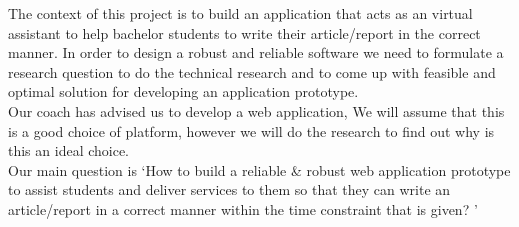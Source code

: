 The context of this project is to build an application that acts as an virtual assistant to help bachelor students to write their article/report in the correct manner. In order to design a robust and reliable software we need to formulate a research question to do the technical research and to come up with feasible and optimal solution for developing an application prototype.\\

Our coach has advised us to develop a web application, We will assume that this is a good choice of platform, however we will do the research to find out why is this an ideal choice. \\

Our main question is `How to build a reliable \& robust web application prototype to assist students and deliver services to them so that they can write an article/report in a correct manner within the time constraint  that is given? '

